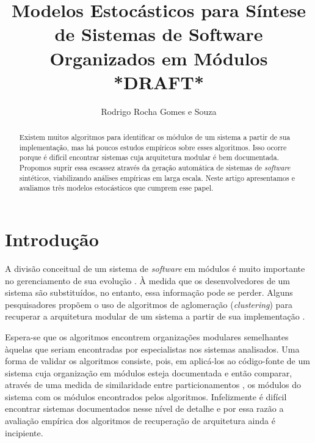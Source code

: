 \documentclass{acm_proc_article-sp}
\begin{document}
\title{Modelos Estocásticos para Síntese de Sistemas de Software Organizados em Módulos \\ *DRAFT*}
\author{Rodrigo Rocha Gomes e Souza}
\maketitle

\begin{abstract}

Existem muitos algoritmos para identificar os módulos de um sistema a partir de sua implementação, mas há poucos estudos empíricos sobre esses algoritmos. Isso ocorre porque é difícil encontrar sistemas cuja arquitetura modular é bem documentada. Propomos suprir essa escassez através da geração automática de sistemas de \emph{software} sintéticos, viabilizando análises empíricas em larga escala. Neste artigo apresentamos e avaliamos três modelos estocásticos que cumprem esse papel.

\end{abstract}

\section{Introdução} %

A divisão conceitual de um sistema de \emph{software} em módulos
é muito importante no gerenciamento de sua evolução \cite{Parnas1972}. À medida que os desenvolvedores de um sistema são substituídos, no entanto, essa informação pode se perder. Alguns pesquisadores propõem o uso de algoritmos de aglomeração (\emph{clustering}) para recuperar a arquitetura modular de um sistema a partir de sua implementação \cite{Mancoridis1998,Andritsos2003,Maqbool2007}.

Espera-se que os algoritmos encontrem organizações modulares semelhantes àquelas que seriam encontradas por  especialistas nos sistemas analisados. Uma forma de validar os algoritmos consiste, pois, em aplicá-los ao código-fonte de um sistema cuja organização em módulos esteja documentada e então comparar, através de uma medida de similaridade entre particionamentos \cite{Tzerpos1999,Wen2004a}, os módulos do sistema com os módulos encontrados pelos algoritmos. Infelizmente é difícil encontrar sistemas documentados nesse nível de detalhe e por essa razão a avaliação empírica dos algoritmos de recuperação de arquitetura ainda é incipiente. %
\end{document}
